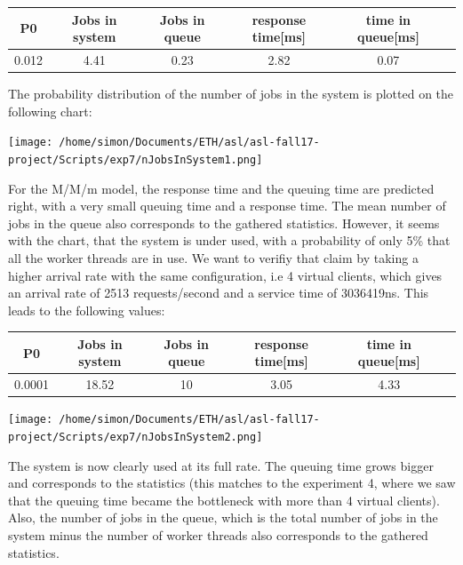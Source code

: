 \documentclass[11pt,a4paper]{article}
\begin{document}
\begin{center}

		\begin{tabular}{|c|c|c|c|c|c|}
			  \hline
			  \textbf{P0} & \textbf{Jobs in system} & \textbf{Jobs in queue} & \textbf{response time[ms]} & \textbf{time in queue[ms]}\\
			  \hline
			  0.012  & 4.41 & 0.23 & 2.82 & 0.07 \\
			  \hline
		\end{tabular}
 
\end{center}
The probability distribution of the number of jobs in the system is plotted on the following chart: 
\begin{center} 
\texttt{[image: /home/simon/Documents/ETH/asl/asl-fall17-project/Scripts/exp7/nJobsInSystem1.png]}
\end{center} 
For the M/M/m model, the response time and the queuing time are predicted right, with a very small queuing time and a response time. The mean number of jobs in the queue also corresponds to the gathered statistics. However, it seems with the chart, that the system is under used, with a probability of only 5\% that all the worker threads are in use. We want to verifiy that claim by taking a higher arrival rate with the same configuration, i.e 4 virtual clients, which gives an arrival rate of 2513 requests/second and a service time of 3036419ns. 
This leads to the following values:
 \begin{center}

		\begin{tabular}{|c|c|c|c|c|c|}
			  \hline
			  \textbf{P0} & \textbf{Jobs in system} & \textbf{Jobs in queue} & \textbf{response time[ms]} & \textbf{time in queue[ms]}\\
			  \hline
			  0.0001  & 18.52 & 10 & 3.05 & 4.33 \\
			  \hline
		\end{tabular}
 
\end{center} 
\begin{center} 
\texttt{[image: /home/simon/Documents/ETH/asl/asl-fall17-project/Scripts/exp7/nJobsInSystem2.png]}
\end{center} 
The system is now clearly used at its full rate. The queuing time grows bigger and corresponds to the statistics (this matches to the experiment 4, where we saw that the queuing time became the bottleneck with more than 4 virtual clients). Also, the number of jobs in the queue, which is the total number of jobs in the system minus the number of worker threads also corresponds to the gathered statistics. 
\\
\\
\end{document}
